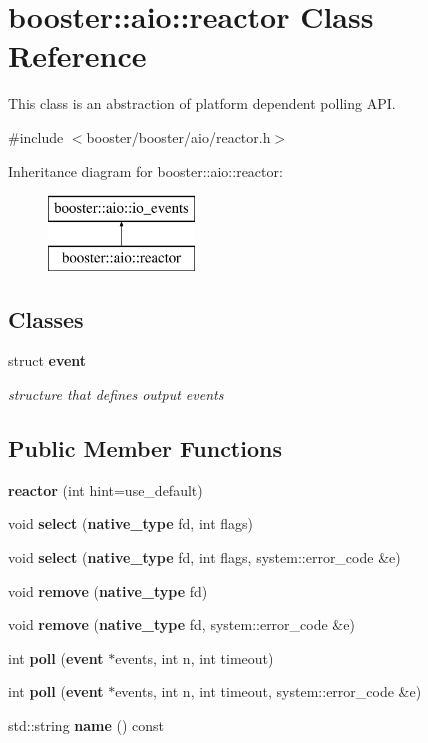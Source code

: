 \section{booster\+:\+:aio\+:\+:reactor Class Reference}
\label{classbooster_1_1aio_1_1reactor}


This class is an abstraction of platform dependent polling A\+PI.  




{\ttfamily \#include $<$booster/booster/aio/reactor.\+h$>$}

Inheritance diagram for booster\+:\+:aio\+:\+:reactor\+:\begin{figure}[H]
\begin{center}
\leavevmode
\includegraphics[height=2.000000cm]{classbooster_1_1aio_1_1reactor}
\end{center}
\end{figure}
\subsection*{Classes}
\begin{DoxyCompactItemize}
\item 
struct {\bf event}
\begin{DoxyCompactList}\small\item\em structure that defines output events \end{DoxyCompactList}\end{DoxyCompactItemize}
\subsection*{Public Member Functions}
\begin{DoxyCompactItemize}
\item 
{\bf reactor} (int hint=use\+\_\+default)
\item 
void {\bf select} ({\bf native\+\_\+type} fd, int flags)
\item 
void {\bf select} ({\bf native\+\_\+type} fd, int flags, system\+::error\+\_\+code \&e)
\item 
void {\bf remove} ({\bf native\+\_\+type} fd)
\item 
void {\bf remove} ({\bf native\+\_\+type} fd, system\+::error\+\_\+code \&e)
\item 
int {\bf poll} ({\bf event} $\ast$events, int n, int timeout)
\item 
int {\bf poll} ({\bf event} $\ast$events, int n, int timeout, system\+::error\+\_\+code \&e)
\item 
std\+::string {\bf name} () const 
\end{DoxyCompactItemize}
